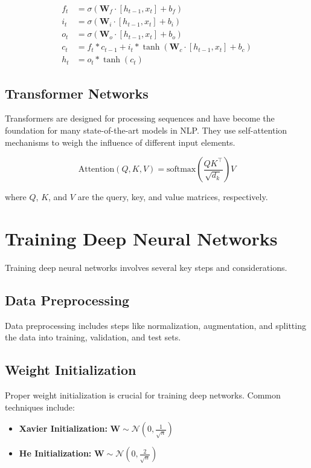 \begin{align}
f_t &= \sigma(\mathbf{W}_f \cdot [h_{t-1}, x_t] + b_f) \\
i_t &= \sigma(\mathbf{W}_i \cdot [h_{t-1}, x_t] + b_i) \\
o_t &= \sigma(\mathbf{W}_o \cdot [h_{t-1}, x_t] + b_o) \\
c_t &= f_t * c_{t-1} + i_t * \tanh(\mathbf{W}_c \cdot [h_{t-1}, x_t] + b_c) \\
h_t &= o_t * \tanh(c_t)
\end{align}

\subsection{Transformer Networks}
Transformers are designed for processing sequences and have become the foundation for many state-of-the-art models in NLP. They use self-attention mechanisms to weigh the influence of different input elements.

\begin{equation}
\text{Attention}(Q, K, V) = \text{softmax}\left(\frac{QK^\top}{\sqrt{d_k}}\right)V
\end{equation}

where \( Q \), \( K \), and \( V \) are the query, key, and value matrices, respectively.

\section{Training Deep Neural Networks}
Training deep neural networks involves several key steps and considerations.

\subsection{Data Preprocessing}
Data preprocessing includes steps like normalization, augmentation, and splitting the data into training, validation, and test sets.

\subsection{Weight Initialization}
Proper weight initialization is crucial for training deep networks. Common techniques include:
\begin{itemize}
    \item \textbf{Xavier Initialization:} \( \mathbf{W} \sim \mathcal{N}(0, \frac{1}{\sqrt{n}}) \)
    \item \textbf{He Initialization:} \( \mathbf{W} \sim \mathcal{N}(0, \frac{2}{\sqrt{n}}) \)
\end{itemize}

